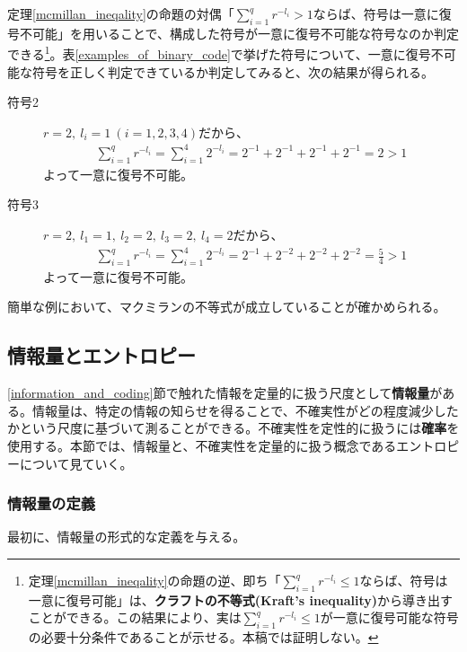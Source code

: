 \documentclass[uplatex,dvipdfmx,b5j,10pt]{jsbook}
\theoremstyle{definition}
\begin{document}
定理\ref{mcmillan_ineqality}の命題の対偶「$\sum_{i=1}^{q}r^{-l_{i}} > 1$ならば、符号は一意に復号不可能」を用いることで、構成した符号が一意に復号不可能な符号なのか判定できる\footnote{定理\ref{mcmillan_ineqality}の命題の逆、即ち「$\sum_{i=1}^{q}r^{-l_{i}} \leq 1$ならば、符号は一意に復号可能」は、\textbf{クラフトの不等式(Kraft's inequality)}から導き出すことができる。この結果により、実は$\sum_{i=1}^{q}r^{-l_{i}} \leq 1$が一意に復号可能な符号の必要十分条件であることが示せる。本稿では証明しない。}。表\ref{examples_of_binary_code}で挙げた符号について、一意に復号不可能な符号を正しく判定できているか判定してみると、次の結果が得られる。
\begin{description}
  \item[符号2] $r = 2,\ l_{i} = 1\ (i = 1,2,3,4)$だから、
      \begin{eqnarray*}
        \sum_{i = 1}^{q} r^{-l_{i}} = \sum_{i = 1}^{4} 2^{-l_{i}} = 2^{-1} + 2^{-1} + 2^{-1} + 2^{-1} = 2 > 1
      \end{eqnarray*}
      よって一意に復号不可能。
  \item[符号3] $r = 2,\ l_{1} = 1,\ l_{2} = 2,\ l_{3} = 2,\ l_{4} = 2$だから、
      \begin{eqnarray*}
        \sum_{i = 1}^{q} r^{-l_{i}} = \sum_{i = 1}^{4} 2^{-l_{i}} = 2^{-1} + 2^{-2} + 2^{-2} + 2^{-2} = \frac{5}{4} > 1
      \end{eqnarray*}
      よって一意に復号不可能。
\end{description}

簡単な例において、マクミランの不等式が成立していることが確かめられる。

\subsection{情報量とエントロピー}

\ref{information_and_coding}節で触れた情報を定量的に扱う尺度として\textbf{情報量}がある。情報量は、特定の情報の知らせを得ることで、不確実性がどの程度減少したかという尺度に基づいて測ることができる。不確実性を定性的に扱うには\textbf{確率}を使用する。本節では、情報量と、不確実性を定量的に扱う概念であるエントロピーについて見ていく。

\subsubsection{情報量の定義}

最初に、情報量の形式的な定義を与える。
\end{document}
